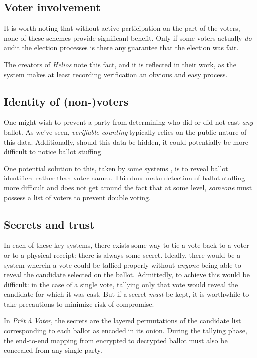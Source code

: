 \documentclass[10pt,twocolumn]{article}
\newcommand{\term}[1]{\textit{#1}}
\newcommand{\preta}{Pr\^{e}t \`{a}}
\newcommand{\pv}{\preta{} Voter}
\begin{document}
\subsection{Voter involvement}

It is worth noting that without active participation on the part of the voters, none of these
schemes provide significant benefit. Only if some voters actually \emph{do} audit the election
processes is there any guarantee that the election was fair.

The creators of \term{Helios} note this fact, and it is reflected in their work, as the system makes at
least recording verification an obvious and easy process.

\subsection{Identity of (non-)voters}

One might wish to prevent a party from determining who did or did not cast \emph{any} ballot.
As we've seen, \term{verifiable counting} typically relies on the public nature of this data.
Additionally, should this data be hidden, it could potentially be more difficult to notice ballot
stuffing.

One potential solution to this, taken by some systems \cite{preta}, is to reveal ballot identifiers
rather than voter names. This does make detection of ballot stuffing more difficult and does not get
around the fact that at some level, \emph{someone} must possess a list of voters to prevent double
voting.

\subsection{Secrets and trust}

In each of these key systems, there exists some way to tie a vote back to a voter or to a physical
receipt: there is always some secret. Ideally, there would be a system wherein a vote could be
tallied properly without \emph{anyone} being able to reveal the candidate selected on the ballot.
Admittedly, to achieve this would be difficult: in the case of a single vote, tallying only that vote
would reveal the candidate for which it was cast. But if a secret \emph{must} be kept, it is
worthwhile to take precautions to minimize risk of compromise.

In \term{\pv{}}, the secrets are the layered permutations of the candidate list corresponding to each ballot as encoded in its onion.
During the tallying phase, the end-to-end mapping from encrypted to decrypted ballot must also be concealed from any single party.
\end{document}
